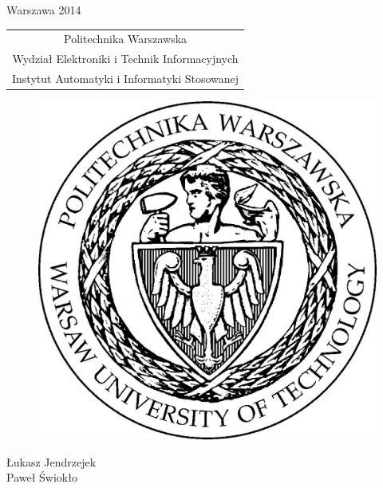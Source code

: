\documentclass[a4paper,12pt]{article}
\begin{document}
   \thispagestyle{empty}
   
   \begin{flushright}
      \rm \large{Warszawa 2014}
   \end{flushright}
  \vskip0.5cm
   
   \begin{flushleft}
        \begin{tabular}{c}
         \large{Politechnika Warszawska}\\
         \large{Wydział Elektroniki i Technik Informacyjnych}\\
         \large{Instytut Automatyki i Informatyki Stosowanej}
      \end{tabular}
   \end{flushleft}
   \vskip1cm
   
   \begin{figure}[ht]
      \centering
      \includegraphics{img/logo_PW.jpg}
   \end{figure}
   \vskip1cm
   
   \begin{center}
      \large{Łukasz Jendrzejek}\\
      \large{Paweł Świokło}\\
   \end{center}
   \vskip0.5in
\end{document}

